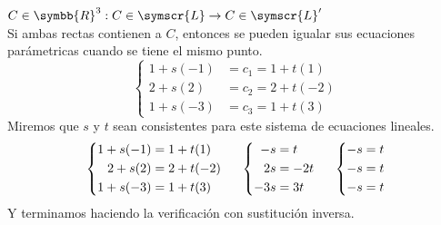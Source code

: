 \documentclass{article}
\def\fancyL{\symscr{L}}
\def\realR{\symbb{R}}
\begin{document}
\begin{enumerate}
\begin{itemize}
\begin{enumerate}[label=\listAlph]
\begin{mathcase}{\(C \in \realR^3: C \in \fancyL \rightarrow C \in \fancyL'\)}
\[                            \]
                            Si ambas rectas contienen a \(C\), entonces se pueden igualar sus ecuaciones parámetricas cuando se tiene el mismo punto.
                            \[
                                \left\{
                                \begin{aligned}
                                    1 + s(-1) &= c_1 = 1 + t(1) \\
                                    2 + s(2) &= c_2 = 2 + t(-2) \\
                                    1 + s(-3) &= c_3 = 1 + t(3)
                                \end{aligned}
                                \right.
                            \]
                            Miremos que \(s\) y \(t\) sean consistentes para este sistema de ecuaciones lineales.
                            \[
                                \left\{
                                \begin{aligned}
                                    1 + s(-1) &= 1 + t(1) \\
                                    2 + s(2) &= 2 + t(-2) \\
                                    1 + s(-3) &= 1 + t(3)
                                \end{aligned}
                                \right.
                                \hspace{0.5cm}
                                \left\{
                                \begin{aligned}
                                    -s &= t \\
                                    2s &= -2t \\
                                    -3s &= 3t
                                \end{aligned}
                                \right.
                                \hspace{0.5cm}
                                \left\{
                                \begin{aligned}
                                    -s &= t \\
                                    -s &= t \\
                                    -s &= t
                                \end{aligned}
                                \right.
                            \]
                            Y terminamos haciendo la verificación con sustitución inversa.

\end{mathcase}
\end{enumerate}
\end{itemize}
\end{enumerate}
\end{document}
